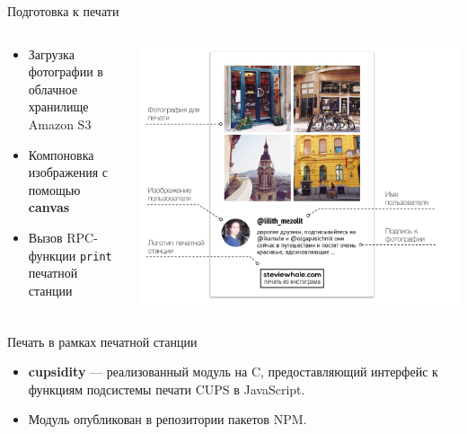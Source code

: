 \documentclass[utf-8]{beamer}
\begin{document}
\begin{frame}{Подготовка к печати}
  \begin{columns}
    \begin{column}{0.4\textwidth}
      \begin{itemize}
        \item Загрузка фотографии в облачное хранилище Amazon S3\\[0.5cm]
        \item Компоновка изображения с помощью \textbf{canvas}\\[0.5cm]
        \item Вызов RPC-функции \texttt{print} печатной станции
      \end{itemize}
    \end{column}

    \begin{column}{0.6\textwidth}
      \begin{center}
        \includegraphics[scale=0.3]{photo-layout.pdf}
      \end{center}
    \end{column}

  \end{columns}
\end{frame}


\def\CC{{C\nolinebreak[4]\hspace{-.05em}\raisebox{.4ex}{\tiny\bf ++}}}

\begin{frame}{Печать в рамках печатной станции}
    \begin{itemize}
      \item \textbf{cupsidity} --- реализованный модуль на \CC, предоставляющий интерфейс к
        функциям подсистемы печати CUPS в JavaScript.\\[0.5cm]
      \item Модуль опубликован в репозитории пакетов NPM.
    \end{itemize}
\end{frame}
\end{document}
